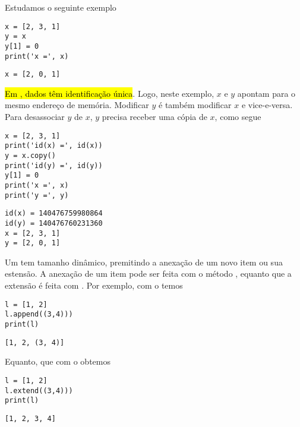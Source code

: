 \begin{obs}
  Estudamos o seguinte exemplo

\begin{lstlisting}
x = [2, 3, 1]
y = x
y[1] = 0
print('x =', x)
\end{lstlisting}

\begin{verbatim}
x = [2, 0, 1]
\end{verbatim}

\hl{Em {\python}, dados têm identificação única}. Logo, neste exemplo, $x$ e $y$ apontam para o mesmo endereço de memória. Modificar $y$ é também modificar $x$ e vice-e-versa. Para desassociar $y$ de $x$, $y$ precisa receber uma cópia de $x$, como segue

\begin{lstlisting}
x = [2, 3, 1]
print('id(x) =', id(x))
y = x.copy()
print('id(y) =', id(y))
y[1] = 0
print('x =', x)
print('y =', y)
\end{lstlisting}

\begin{verbatim}
id(x) = 140476759980864
id(y) = 140476760231360
x = [2, 3, 1]
y = [2, 0, 1]
\end{verbatim}

\end{obs}

\begin{obs}
  Um {\PYTHONlist} tem tamanho dinâmico, premitindo a anexação de um novo item ou sua estensão. A anexação de um item pode ser feita com o método {\PYTHONlistDOTappend}, equanto que a extensão é feita com {\PYTHONlistDOTextend}. Por exemplo, com o {\PYTHONlistDOTappend} temos

\begin{lstlisting}
l = [1, 2]
l.append((3,4)))
print(l)
\end{lstlisting}

\begin{verbatim}
[1, 2, (3, 4)]
\end{verbatim}

Equanto, que com o {\PYTHONlistDOTextend} obtemos

\begin{lstlisting}
l = [1, 2]
l.extend((3,4)))
print(l)
\end{lstlisting}
  
\begin{verbatim}
[1, 2, 3, 4]
\end{verbatim}
  
\end{obs}

